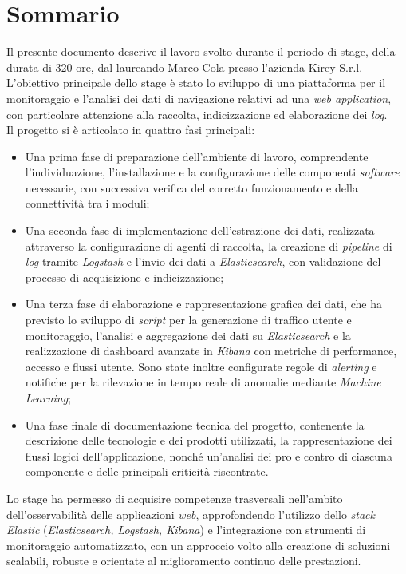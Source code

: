 \cleardoublepage
{}
{}
\begingroup
\let\clearpage\relax
\let\cleardoublepage\relax
\let\cleardoublepage\relax

\chapter*{Sommario}

Il presente documento descrive il lavoro svolto durante il periodo di stage, della durata di 320 ore, dal laureando Marco Cola presso l'azienda Kirey S.r.l. \\
L'obiettivo principale dello stage è stato lo sviluppo di una piattaforma per il monitoraggio e l'analisi dei dati di navigazione relativi ad una \emph{web application}, con particolare attenzione alla raccolta, indicizzazione ed elaborazione dei \emph{log}. \\
Il progetto si è articolato in quattro fasi principali:

\begin{itemize}
    \item Una prima fase di preparazione dell'ambiente di lavoro, comprendente l'individuazione, l'installazione e la configurazione delle componenti \emph{software} necessarie, con successiva verifica del corretto funzionamento e della connettività tra i moduli;
    \item Una seconda fase di implementazione dell'estrazione dei dati, realizzata attraverso la configurazione di agenti di raccolta, la creazione di \emph{pipeline} di \emph{log} tramite \emph{Logstash} e l'invio dei dati a \emph{Elasticsearch}, con validazione del processo di acquisizione e indicizzazione;
    \item Una terza fase di elaborazione e rappresentazione grafica dei dati, che ha previsto lo sviluppo di \emph{script} per la generazione di traffico utente e monitoraggio, l'analisi e aggregazione dei dati su \emph{Elasticsearch} e la realizzazione di dashboard avanzate in \emph{Kibana} con metriche di performance, accesso e flussi utente. Sono state inoltre configurate regole di \emph{alerting} e notifiche per la rilevazione in tempo reale di anomalie mediante \emph{Machine Learning};
    \item Una fase finale di documentazione tecnica del progetto, contenente la descrizione delle tecnologie e dei prodotti utilizzati, la rappresentazione dei flussi logici dell'applicazione, nonché un'analisi dei pro e contro di ciascuna componente e delle principali criticità riscontrate.
\end{itemize}
Lo stage ha permesso di acquisire competenze trasversali nell'ambito dell'osservabilità delle applicazioni \emph{web}, approfondendo l'utilizzo dello \emph{stack} \emph{Elastic} (\emph{Elasticsearch, Logstash, Kibana}) e l'integrazione con strumenti di monitoraggio automatizzato, con un approccio volto alla creazione di soluzioni scalabili, robuste e orientate al miglioramento continuo delle prestazioni.



\endgroup

\vfill

